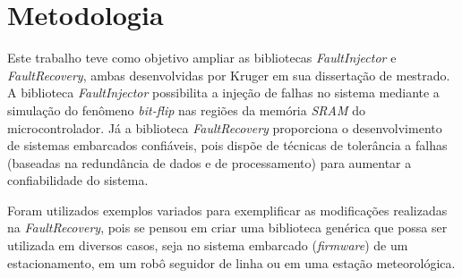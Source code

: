 
\chapter{Metodologia} \label{cap:metodologia}


Este trabalho teve como objetivo ampliar as bibliotecas \textit{FaultInjector} e \textit{FaultRecovery}, ambas desenvolvidas por Kruger \cite{Kruger:2014} em sua dissertação de mestrado. A biblioteca \textit{FaultInjector} possibilita a injeção de falhas no sistema mediante a simulação do fenômeno \textit{bit-flip} nas regiões da memória \textit{SRAM} do microcontrolador. Já a biblioteca \textit{FaultRecovery} proporciona o desenvolvimento de sistemas embarcados confiáveis, pois dispõe de técnicas de tolerância a falhas (baseadas na redundância de dados e de processamento) para aumentar a confiabilidade do sistema.

Foram utilizados exemplos variados para exemplificar as modificações realizadas na \textit{FaultRecovery}, pois se pensou em criar uma biblioteca genérica que possa ser utilizada em diversos casos, seja no sistema embarcado (\textit{firmware}) de um estacionamento, em um robô seguidor de linha ou em uma estação meteorológica.

